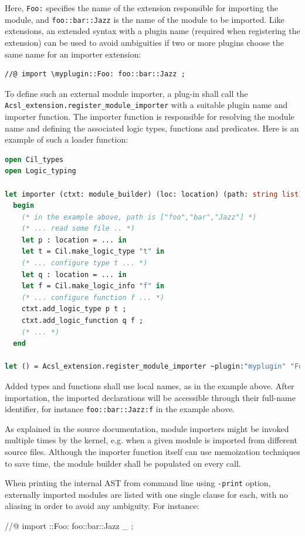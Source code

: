 Here, \verb+Foo:+ specifies the name of the \acsl extension responsible for
importing the module, and \verb+foo::bar::Jazz+ is the name of the module to be
imported. Like \acsl extensions, an extended syntax with a plugin name (required
when registering the extension) can be used to avoid ambiguities if two or
more plugins choose the same name for an importer extension:

\begin{lstlisting}[style=c]
  //@ import \myplugin::Foo: foo::bar::Jazz ;
\end{lstlisting}

To define such an external module importer, a plug-in shall call the
\verb+Acsl_extension.register_module_importer+ with a suitable plugin name and
importer function. The importer function is responsible for resolving the module
name and defining the associated \acsl logic types, functions and predicates.
Here is an example of such a loader function:

\begin{lstlisting}[language=OCaml]
open Cil_types
open Logic_typing

let importer (ctxt: module_builder) (loc: location) (path: string list) =
  begin
    (* in the example above, path is ["foo","bar","Jazz"] *)
    (* ... read some file .. *)
    let p : location = ... in
    let t = Cil.make_logic_type "t" in
    (* ... configure type t ... *)
    let q : location = ... in
    let f = Cil.make_logic_info "f" in
    (* ... configure function f ... *)
    ctxt.add_logic_type p t ;
    ctxt.add_logic_function q f ;
    (* ... *)
  end

let () = Acsl_extension.register_module_importer ~plugin:"myplugin" "Foo" importer
\end{lstlisting}

Added types and functions shall use local names, as in the example above.
After importation, the imported declarations will be accessible through
their full-name identifier, for instance \verb+foo::bar::Jazz:f+
in the example above.

As explained in the \framac source documentation, module importers might be
invoked multiple times by the kernel, e.g. when a given module is imported from
different source files. Although the importer function itself can use
memoization techniques to save time, the module builder shall be populated on
every call.

When printing the internal AST from \framac command line using \verb+-print+
option, externally imported modules are listed with one single clause for each,
with no aliasing in order to avoid any ambiguity. For instance:
\begin{ccode}
//@ import \myplugin::Foo: foo::bar::Jazz \as _ ;
\end{ccode}

